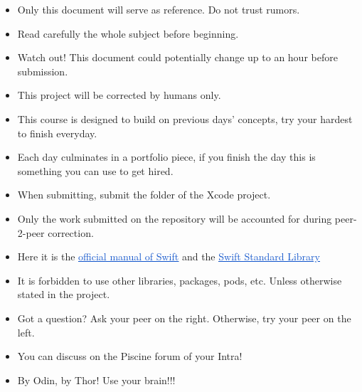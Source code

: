 \documentclass[12pt]{report}
\begin{document}
\begin{itemize}
	\item Only this document will serve as reference. Do not trust rumors.\par

	\item Read carefully the whole subject before beginning.\par

	\item Watch out! This document could potentially change up to an hour before submission.\par

	\item This project will be corrected by humans only.\par

	\item This course is designed to build on previous days’ concepts, try your hardest to finish everyday.\par

	\item Each day culminates in a portfolio piece, if you finish the day this is something you can use to get hired.\par

	\item When submitting, submit the folder of the Xcode project.\par

	\item Only the work submitted on the repository will be accounted for during peer-2-peer correction.\par

	\item Here it is the \href{https://docs.swift.org/swift-book/}{\textcolor[HTML]{1155CC}{\uline{official manual of Swift}}} and the \href{https://developer.apple.com/documentation/swift/swift_standard_library}{\textcolor[HTML]{1155CC}{\uline{Swift Standard Library}}}\par

	\item It is forbidden to use other libraries, packages, pods, etc. Unless otherwise stated in the project.\par

	\item Got a question? Ask your peer on the right. Otherwise, try your peer on the left.\par

	\item You can discuss on the Piscine forum of your Intra!\par

	\item By Odin, by Thor! Use your brain!!!
\end{itemize}\par
\end{document}
